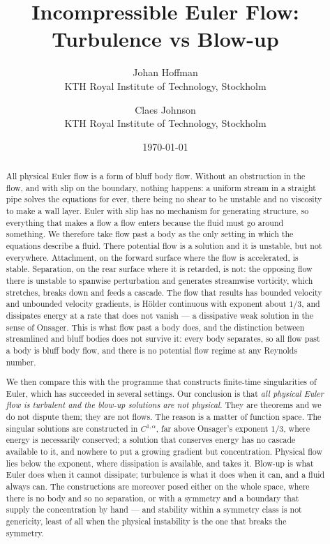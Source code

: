 \documentclass[11pt]{article}
\title{\vspace{-2em}Incompressible Euler Flow: Turbulence vs Blow-up}
\author{Johan Hoffman\\[0.2em]
\small KTH Royal Institute of Technology, Stockholm
\and Claes Johnson\\[0.2em]
\small KTH Royal Institute of Technology, Stockholm}
\date{\today}
\begin{document}
\maketitle

\begin{abstract}
\noindent
All physical Euler flow is a form of bluff body flow. Without an obstruction in the flow, and with
slip on the boundary, nothing happens: a uniform stream in a straight pipe solves the equations for
ever, there being no shear to be unstable and no viscosity to make a wall layer. Euler with slip has
no mechanism for generating structure, so everything that makes a flow a flow enters because the
fluid must go around something. We therefore take flow past a body as the only setting in which the
equations describe a fluid. There potential flow is a solution and it is unstable, but not
everywhere. Attachment, on the forward surface where the flow
is accelerated, is stable. Separation, on the rear surface where it is retarded, is not: the
opposing flow there is unstable to spanwise perturbation and generates streamwise vorticity, which
stretches, breaks down and feeds a cascade. The flow that results has bounded velocity and
unbounded velocity gradients, is H\"older continuous with exponent about $1/3$, and dissipates
energy at a rate that does not vanish --- a dissipative weak solution in the sense of Onsager. This
is what flow past a body does, and the distinction between streamlined and bluff bodies does not
survive it: every body separates, so all flow past a body is bluff body flow, and there is no
potential flow regime at any Reynolds number.

We then compare this with the programme that constructs finite-time singularities of Euler, which
has succeeded in several settings. Our conclusion is that \emph{all physical Euler flow is
turbulent and the blow-up solutions are not physical}. They are theorems and we do not dispute
them; they are not flows. The reason is a matter of function space. The singular solutions are
constructed in $C^{1,\alpha}$, far above Onsager's exponent $1/3$, where energy is necessarily
conserved; a solution that conserves energy has no cascade available to it, and nowhere to put a
growing gradient but concentration. Physical flow lies below the exponent, where dissipation is
available, and takes it. Blow-up is what Euler does when it cannot dissipate; turbulence is what it
does when it can, and a fluid always can. The constructions are moreover posed either on the whole
space, where there is no body and so no separation, or with a symmetry and a boundary that supply
the concentration by hand --- and stability within a symmetry class is not genericity, least of all
when the physical instability is the one that breaks the symmetry.
\end{abstract}
\end{document}
